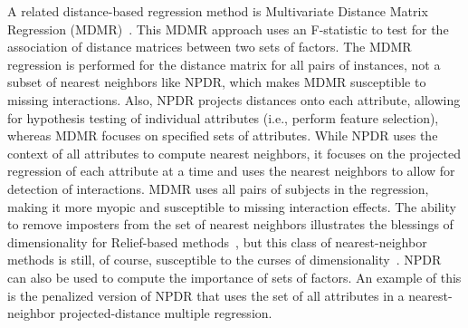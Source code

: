 \documentclass[10pt]{article}
\begin{document}


A related distance-based regression method is Multivariate Distance Matrix Regression (MDMR)~\cite{schork12}. This MDMR approach uses an F-statistic to test for the association of distance matrices between two sets of factors. The MDMR regression is performed for the distance matrix for all pairs of instances, not a subset of nearest neighbors like NPDR, which makes MDMR susceptible to missing interactions. Also, NPDR projects distances onto each attribute, allowing for hypothesis testing of individual attributes (i.e., perform feature selection), whereas MDMR focuses on specified sets of attributes. While NPDR uses the context of all attributes to compute nearest neighbors, it focuses on the projected regression of each attribute at a time and uses the nearest neighbors to allow for detection of interactions. MDMR uses all pairs of subjects in the regression, making it more myopic and susceptible to missing interaction effects. The ability to remove imposters from the set of nearest neighbors illustrates the blessings of dimensionality for Relief-based methods~\cite{bod}, but this class of nearest-neighbor methods is still, of course, susceptible to the curses of dimensionality~\cite{CoD}. NPDR can also be used to compute the importance of sets of factors. An example of this is the penalized version of NPDR that uses the set of all attributes in a nearest-neighbor projected-distance multiple regression.
\end{document}
